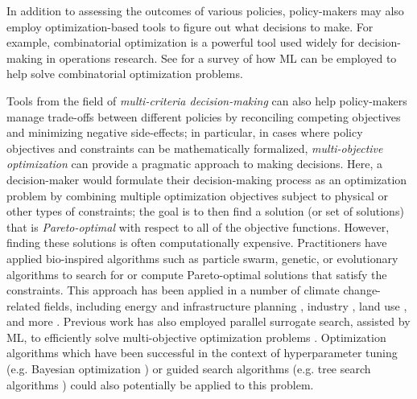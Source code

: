 \documentclass[11pt]{report}
\begin{document}
In addition to assessing the outcomes of various policies, policy-makers may also employ optimization-based tools to figure out what decisions to make.
For example, combinatorial optimization is a powerful tool used widely for decision-making in operations research. See \cite{2018arXiv181106128B} for a survey of how ML can be employed to help solve combinatorial optimization problems.

Tools from the field of \emph{multi-criteria decision-making} can also help policy-makers manage trade-offs between different policies by reconciling competing objectives and minimizing negative side-effects; in particular, in cases where policy objectives and constraints can be mathematically formalized, \emph{multi-objective optimization} can provide a pragmatic approach to making decisions. 
Here, a decision-maker would formulate their decision-making process as an optimization problem by combining multiple optimization objectives subject to physical or other types of constraints;
the goal is to then find a solution (or set of solutions) that is \emph{Pareto-optimal} with respect to all of the objective functions.
However, finding these solutions is often computationally expensive.
Practitioners have applied bio-inspired algorithms such as particle swarm, genetic, or evolutionary algorithms to search for or compute Pareto-optimal solutions that satisfy the constraints.
This approach has been applied in a number of climate change-related fields, including energy and infrastructure planning \cite{pohekar, mattiussi, atabaki, shi_dendritic, wu2018efficiently, jhhan}, industry \cite{hassine, chaabane}, land use \cite{lakicevic, varma}, and more \cite{gutierrez, miniciardi, chen, lithuania}. 
Previous work has also employed parallel surrogate search, assisted by ML, to efficiently solve multi-objective optimization problems \cite{akhtar2019efficient}.
Optimization algorithms which have been successful in the context of hyperparameter tuning (e.g. Bayesian optimization \cite{shahriari2015taking, Snoek:2012:PBO:2999325.2999464}) or guided search algorithms (e.g. tree search algorithms \cite{alphazero}) could also potentially be applied to this problem.
\end{document}

